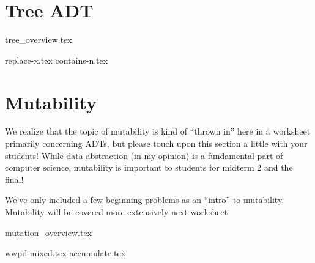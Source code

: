 \documentclass{exam}
\begin{document}
\newpage
\section{Tree ADT}
{tree_overview.tex}
\begin{questions}
    {replace-x.tex}
    {contains-n.tex}
\end{questions}

\newpage
\section{Mutability}
\begin{meta}
    We realize that the topic of mutability is kind of ``thrown in'' here in a worksheet primarily concerning ADTs, but please touch upon this section a little with your students! While data abstraction (in my opinion) is a fundamental part of computer science, mutability is important to students for midterm 2 and the final!

    We've only included a few beginning problems as an ``intro'' to mutability. Mutability will be covered more extensively next worksheet.
\end{meta}
{mutation_overview.tex}
\begin{questions}
    {wwpd-mixed.tex}
    {accumulate.tex}
\end{questions}
\end{document}
